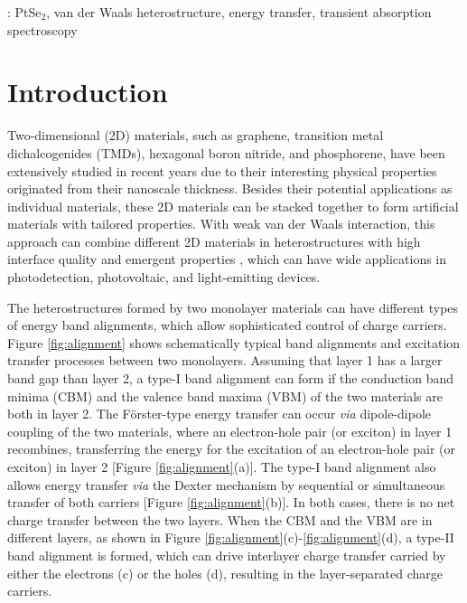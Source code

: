 \documentclass[10pt]{iopart}
\begin{document}
%
\vspace{2pc}
: PtSe$_2$, van der Waals
heterostructure, energy transfer, transient absorption spectroscopy

%
\submitto{\TDM}
%
% 
\ioptwocol
%

\section{Introduction}

Two-dimensional (2D) materials, such as graphene\cite{geim2007rise}, transition metal dichalcogenides (TMDs)\cite{splendiani2010emerging,mak2010atomically}, hexagonal boron nitride\cite{song2010large}, and phosphorene\cite{wang2014two,hu2018two,lin20162d},  have been extensively studied in recent years due to their interesting physical properties originated from their nanoscale thickness. Besides their potential applications as individual materials\cite{zhang2014electrically},  these 2D materials can be stacked together to form artificial materials with tailored properties. With weak van der Waals interaction, this approach can combine different 2D materials in heterostructures with high interface quality and emergent properties \cite{xia2017recent}, which can have wide applications in photodetection\cite{yu2013highly},  photovoltaic\cite{britnell2013strong,furchi2014photovoltaic},  and light-emitting devices\cite{cheng2014electroluminescence}.

The heterostructures formed by two monolayer materials can have different types of energy band alignments, which allow sophisticated control of charge carriers. Figure \ref{fig:alignment} shows schematically typical band alignments and excitation transfer processes between two monolayers\cite{bellus2017type}.  Assuming that layer 1 has a larger band gap than layer 2, a type-I band alignment can form if the conduction band minima (CBM) and the valence band maxima (VBM) of the two materials are both in layer 2. The F{\"o}rster-type energy transfer can occur {\it via} dipole-dipole coupling of the two materials, where an electron-hole pair (or exciton) in layer 1 recombines, transferring the energy for the excitation of an electron-hole pair (or exciton) in layer 2 [Figure \ref{fig:alignment}(a)]\cite{hoeben2005supramolecular}.   The type-I band alignment also allows energy transfer {\it via} the Dexter mechanism by sequential or simultaneous transfer of both carriers [Figure \ref{fig:alignment}(b)]\cite{dexter1953theory,murphy2004probing}. In both cases, there is no net charge transfer between the two layers. When the CBM and the VBM are in different layers, as shown in Figure \ref{fig:alignment}(c)-\ref{fig:alignment}(d), a type-II band alignment is formed, which can drive interlayer charge transfer carried by either the electrons (c) or the holes (d), resulting in the layer-separated charge carriers. 
\end{document}
